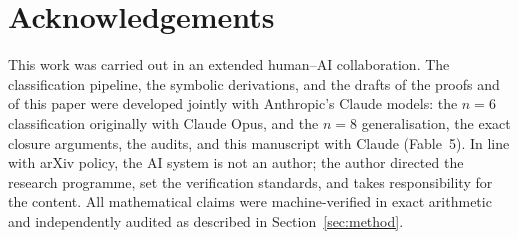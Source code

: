 \documentclass[11pt]{amsart}
\theoremstyle{definition}
\begin{document}
\section*{Acknowledgements}

This work was carried out in an extended human--AI collaboration. The
classification pipeline, the symbolic derivations, and the drafts of the
proofs and of this paper were developed jointly with Anthropic's Claude
models: the $n=6$ classification originally with Claude Opus, and the
$n=8$ generalisation, the exact closure arguments, the audits, and this
manuscript with Claude (Fable~5). In line with arXiv policy, the AI
system is not an author; the author directed the research programme, set
the verification standards, and takes responsibility for the content.
All mathematical claims were machine-verified in exact arithmetic and
independently audited as described in Section~\ref{sec:method}.
\end{document}
